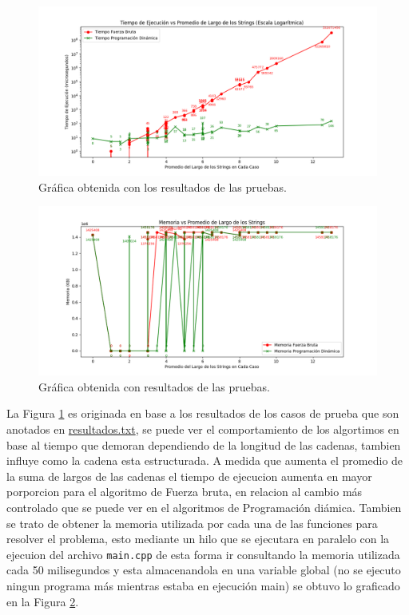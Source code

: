 \begin{figure}[H]
    \centering
    \includegraphics[width=1\textwidth]{images/Figure_1.png}
    \caption{Gráfica obtenida con los resultados de las pruebas.}
    \label{fig:tiempo}
\end{figure}
\begin{figure}[H]
    \centering
    \includegraphics[width=1\textwidth]{images/Figure_2.png}
    \caption{Gráfica obtenida con resultados de las pruebas.}
    \label{fig:memoria}
\end{figure}

La Figura \ref{fig:tiempo} es originada en base a los resultados de los casos de prueba que son anotados en \href{https://github.com/luphin/Tarea2y3Algoritmos-FB-PD/blob/main/codigos/resultados.txt}{resultados.txt}, se puede ver el comportamiento de los algortimos en base al tiempo que demoran dependiendo de la longitud de las cadenas, tambien influye como la cadena esta estructurada. A medida que aumenta el promedio de la suma de largos de las cadenas el tiempo de ejecucion aumenta en mayor porporcion para el algoritmo de Fuerza bruta, en relacion al cambio más controlado que se puede ver en el algoritmos de Programación diámica. Tambien se trato de obtener la memoria utilizada por cada una de las funciones para resolver el problema, esto mediante un hilo que se ejecutara en paralelo con la ejecuion del archivo \texttt{main.cpp} de esta forma ir consultando la memoria utilizada cada 50 milisegundos y esta almacenandola en una variable global (no se ejecuto ningun programa más mientras estaba en ejecución main) se obtuvo lo graficado en la Figura \ref{fig:memoria}.
